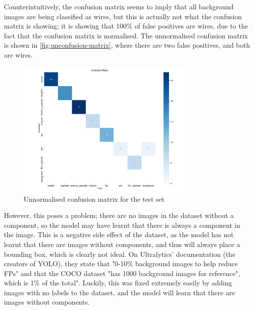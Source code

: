 Counterintuitively, the confusion matrix seems to imply that all background images are being classified as wires, but this is actually not what the confusion matrix is showing; it is showing that 100\% of false positives are wires, due to the fact that the confusion matrix is normalised. The unnormalised confusion matrix is shown in \autoref{fig:unconfusion-matrix}, where there are two false positives, and both are wires.

\begin{figure}[H]
    \centering
    \includegraphics[width=0.8\textwidth]{imgs/graphs/unconfusion_matrix_test.png}
    \caption{Unnormalised confusion matrix for the test set}
    \label{fig:unconfusion-matrix}
  \end{figure}

However, this poses a problem; there are no images in the dataset without a component, so the model may have learnt that there is always a component in the image. This is a negative side effect of the dataset, as the model has not learnt that there are images without components, and thus will always place a bounding box, which is clearly not ideal. On Ultralytics' documentation \cite{ultralytics_2023} (the creators of YOLO), they state that "0-10\% background images to help reduce FPs" and that the COCO dataset "has 1000 background images for reference", which is 1\% of the total". Luckily, this was fixed extremely easily by adding images with no labels to the dataset, and the model will learn that there are images without components.

